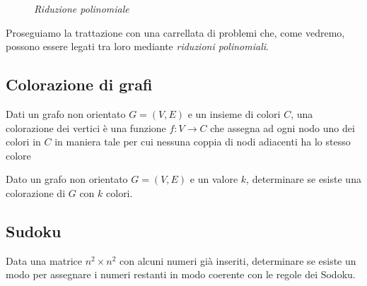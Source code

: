 \begin{figure}[h!]
\centering
{}
\caption{\emph{Riduzione polinomiale}}
\end{figure}

\noindent
Proseguiamo la trattazione con una carrellata di problemi che, come vedremo,
possono essere legati tra loro mediante \emph{riduzioni polinomiali}.

\subsection{Colorazione di grafi}
\begin{definition}
    Dati un grafo non orientato $G=(V,E)$ e un insieme di colori $C$, una
    colorazione dei vertici è una funzione $f:V\to C$ che assegna ad ogni nodo
    uno dei colori in $C$ in maniera tale per cui nessuna coppia di nodi adiacenti
    ha lo stesso colore
\end{definition}
\begin{problem}
    Dato un grafo non orientato $G=(V,E)$ e un valore $k$, determinare se
    esiste una colorazione di $G$ con $k$ colori.
\end{problem}

\subsection{Sudoku}
\begin{problem}
    Data una matrice $n^2\times n^2$ con alcuni numeri già inseriti, determinare
    se esiste un modo per assegnare i numeri restanti in modo coerente con le
    regole dei Sodoku.
\end{problem}

